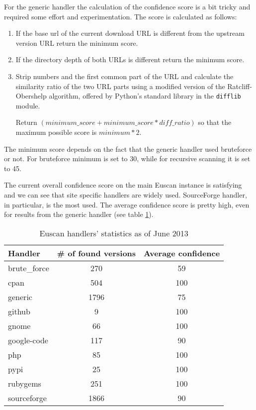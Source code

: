 For the generic handler the calculation of the confidence score is a bit tricky and required some effort and experimentation. The score is calculated as follows:

\begin{enumerate}
\item If the base url of the current download URL is different from the upstream version URL return the minimum score.

\item If the directory depth of both URLs is different return the minimum score.

\item Strip numbers and the first common part of the URL and calculate the similarity ratio of the two URL parts using a modified version of the Ratcliff-Obershelp algorithm, offered by Python's standard library in the \texttt{difflib} module.

Return
$(minimum\_score + minimum\_score * diff\_ratio)$
so that the maximum possible score is $minimum * 2$.
\end{enumerate}

The minimum score depends on the fact that the generic handler used bruteforce or not. For bruteforce minimum is set to 30, while for recursive scanning it is set to 45.

The current overall confidence score on the main Euscan instance is satisfying and we can see that site specific handlers are widely used. SourceForge handler, in particular, is the most used. The average confidence score is pretty high, even for results from the generic handler (see table \ref{table:handlers_stats}).

\bgroup
\def\arraystretch{1.2}
\begin{table}[ht]
\caption{Euscan handlers' statistics as of June 2013}
\label{table:handlers_stats}
\centering
\begin{tabular}{l c c}
\\
\hline\hline
Handler & \# of found versions & Average confidence \\
\hline 
brute\_force & 270 & 59 \\
cpan & 504 & 100 \\
generic & 1796 & 75 \\
github & 9 & 100 \\
gnome & 66 & 100 \\
google-code & 117 & 90 \\
php & 85 & 100 \\
pypi & 25 & 100 \\
rubygems & 251 & 100 \\
sourceforge & 1866 & 90 \\
\hline
\end{tabular}
\end{table}
\egroup

